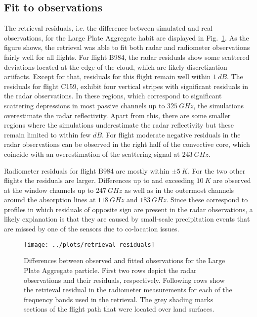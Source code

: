 \documentclass[journal abbreviation, manuscript]{copernicus}
\begin{document}
\subsection{Fit to observations}

The retrieval residuals, i.e. the difference between simulated and real
observations, for the Large Plate Aggregate habit are displayed in
Fig.~\ref{fig:residuals}. As the figure shows, the retrieval was able to fit
both radar and radiometer observations fairly well for all flights. For flight
B984, the radar residuals show some scattered deviations located at the edge of
the cloud, which are likely discretization artifacts. Except for that, residuals
for this flight remain well within $1\ \unit{dB}$. The residuals for flight
C159, exhibit four vertical stripes with significant residuals in the radar
observations. In these regions, which correspond to significant scattering
depressions in most  passive channels up to $325\ \unit{GHz}$, the simulations
overestimate the radar reflectivity. Apart from this, there are some smaller
regions where the simulations underestimate the radar reflectivity but these
remain limited to within few $\unit{dB}$. For flight moderate negative residuals
in the radar observations can be observed in the right half of the convective
core, which coincide with an overestimation of the scattering signal at
$243\ \unit{GHz}$.

Radiometer residuals for flight B984 are mostly within $\pm 5\ \unit{K}$. For
the two other flights the residuals are larger. Differences up to and exceeding
$10\ \unit{K}$ are observed at the window channels up to $247\ \unit{GHz}$ as
well as in the outermost channels around the absorption lines at
$118\ \unit{GHz}$ and $183\ \unit{GHz}$. Since these correspond to profiles in
which residuals of opposite sign are present in the radar observations, a likely
explanation is that they are caused by small-scale precipitation events that are
missed by one of the sensors due to co-location issues.


\begin{figure}[!hbpt]
  \centering
  \texttt{[image: ../plots/retrieval\_residuals]}
  \caption{Differences between observed and fitted observations for the Large
    Plate Aggregate particle. First two rows depict the radar observations and
    their residuals, respectively. Following rows show the retrieval residual in
    the radiometer measurements for each of the frequency bands used in the
    retrieval. The grey shading marks sections of the flight path that were
    located over land surfaces. }
  \label{fig:residuals}
\end{figure}
\end{document}
